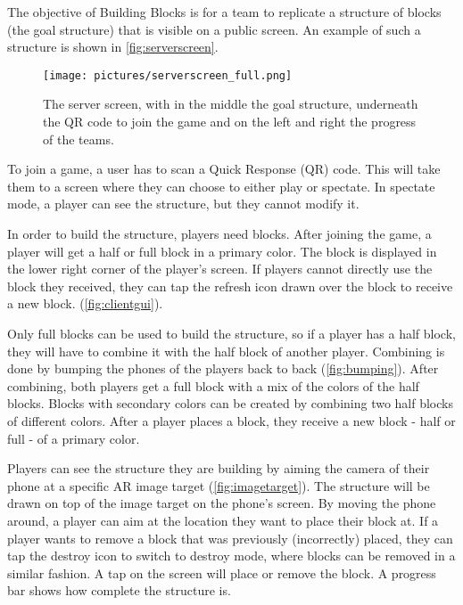 \documentclass{chi-ext}
\begin{document}

The objective of Building Blocks is for a team to replicate a structure of blocks (the goal structure) that is visible on a public screen. An example of such a structure is shown in \autoref{fig:serverscreen}.

\begin{figure}
	\begin{center}
    	\texttt{[image: pictures/serverscreen\_full.png]}
        \caption{The server screen, with in the middle the goal structure, underneath the QR code to join the game and on the left and right the progress of the teams.}
        \label{fig:serverscreen}
    \end{center}
\end{figure}

To join a game, a user has to scan a Quick Response (QR) code. This will take them to a screen where they can choose to either play or spectate. In spectate mode, a player can see the structure, but they cannot modify it.

In order to build the structure, players need blocks. After joining the game, a player will get a half or full block in a primary color. The block is displayed in the lower right corner of the player's screen. If players cannot directly use the block they received, they can tap the refresh icon drawn over the block to receive a new block. (\autoref{fig:clientgui}).

Only full blocks can be used to build the structure, so if a player has a half block, they will have to combine it with the half block of another player. Combining is done by bumping the phones of the players back to back (\autoref{fig:bumping}). After combining, both players get a full block with a mix of the colors of the half blocks. Blocks with secondary colors can be created by combining two half blocks of different colors. After a player places a block, they receive a new block - half or full - of a primary color.

Players can see the structure they are building by aiming the camera of their phone at a specific AR image target (\autoref{fig:imagetarget}). The structure will be drawn on top of the image target on the phone's screen. By moving the phone around, a player can aim at the location they want to place their block at. If a player wants to remove a block that was previously (incorrectly) placed, they can tap the destroy icon to switch to destroy mode, where blocks can be removed in a similar fashion. A tap on the screen will place or remove the block. A progress bar shows how complete the structure is.
\end{document}

